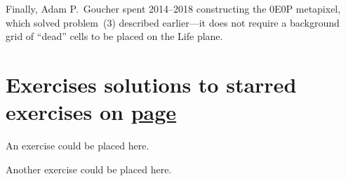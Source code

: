 
Finally, Adam P.~Goucher spent 2014--2018 constructing the 0E0P metapixel, which solved problem~(3) described earlier---it does not require a background grid of ``dead'' cells to be placed on the Life plane.


\section*{Exercises \hfill \normalfont\textsf{\small solutions to starred exercises on \hyperlink{solutions_0e0p}{page \pageref{solutions_0e0p}}}}
\label{sec:solutions_0e0p}
\vspace*{-0.4cm}\hrulefill\vspace*{-0.3cm}\footnotesize\begin{multicols}{2}\vspace*{-0.4cm}\raggedcolumns{}
\setlength{\parskip}{0pt}


\begin{problem}\label{exer:0e0p_ex1}
	An exercise could be placed here.
\end{problem}


\mfilbreak


\begin{problem}\label{exer:0e0p_ex2}
	Another exercise could be placed here.
\end{problem}


\end{multicols}
\normalsize\vspace*{0.01cm}

